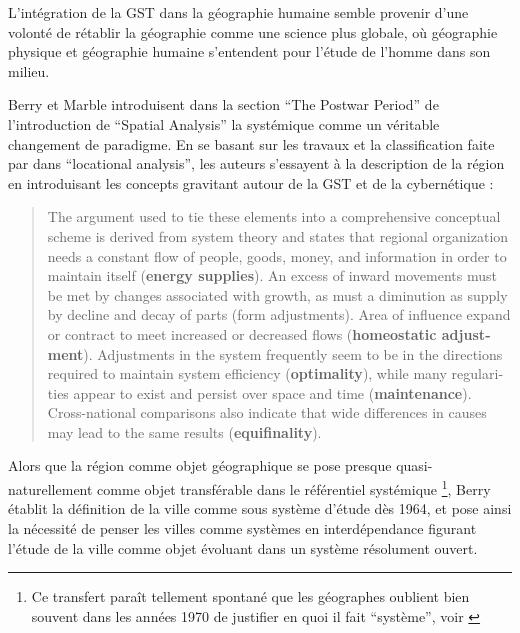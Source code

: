 L'intégration de la GST dans la géographie humaine semble provenir d'une volonté de rétablir la géographie comme une science plus globale, où géographie physique et géographie humaine s'entendent pour l'étude de l'homme dans son milieu.

Berry et Marble introduisent dans la section \foreignquote{english}{The Postwar Period} de l'introduction de \foreignquote{english}{Spatial Analysis} \autocite{Berry1968} la systémique comme un véritable changement de paradigme. En se basant sur les travaux et la classification faite par \textcite{Haggett1965} dans \foreignquote{english}{locational analysis}, les auteurs s'essayent à la description de la région en introduisant les concepts gravitant autour de la GST et de la cybernétique :

\foreignblockquote{english}{The argument used to tie these elements into a comprehensive conceptual scheme is derived from system theory and states that regional organization needs a constant flow of people, goods, money, and information in order to maintain itself (\textbf{energy supplies}). An excess of inward movements must be met by changes associated with growth, as must a diminution as supply by decline and decay of parts (form adjustments). Area of influence expand or contract to meet increased or decreased flows (\textbf{homeostatic adjustment}). Adjustments in the system frequently seem to be in the directions required to maintain system efficiency (\textbf{optimality}), while many regularities appear to exist and persist over space and time (\textbf{maintenance}). Cross-national comparisons also indicate that wide differences in causes may lead to the same results (\textbf{equifinality}).}

Alors que la région comme objet géographique se pose presque quasi-naturellement comme objet transférable dans le référentiel systémique \footnote{Ce transfert paraît tellement spontané que les géographes oublient bien souvent dans les années 1970 de justifier en quoi il fait \enquote{système}, voir \autocite{Orain2001}}, Berry établit la définition de la ville comme sous système d'étude dès 1964, et pose ainsi la nécessité de penser les villes comme systèmes en interdépendance figurant l'étude de la ville comme objet évoluant dans un système résolument ouvert.

